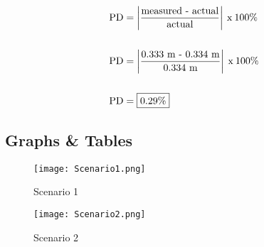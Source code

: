 \begin{align*}
	\text{PD}	&= \left| \frac{\text{measured - actual}}{\text{actual}} \right|\: \text{x}\: 100\% \\ \\
	\text{PD}	&= \left| \frac{\text{0.333\text{ m} - 0.334\text{ m}}}{\text{0.334\text{ m}}} \right|\: \text{x}\: 100\% \\ \\
	\text{PD} &= \boxed{0.29\%} 
\end{align*}


\subsection{Graphs \& Tables}

\begin{figure}[H]
	\captionsetup{font=large}
	\caption{Scenario 1}\label{fig:Scenario1}
	\begin{center}
		\texttt{[image: Scenario1.png]}
	\end{center}
\end{figure}

\vspace{-0.5cm}

\begin{table}[H]
\centering
\captionsetup{font=large}
\caption{Scenario 1 - Values}
\label{tab:s1tab}
\end{table}


\begin{figure}[H]
	\captionsetup{font=large}
	\caption{Scenario 2}\label{fig:Scenario2}
	\begin{center}
		\texttt{[image: Scenario2.png]}
	\end{center}
\end{figure}

